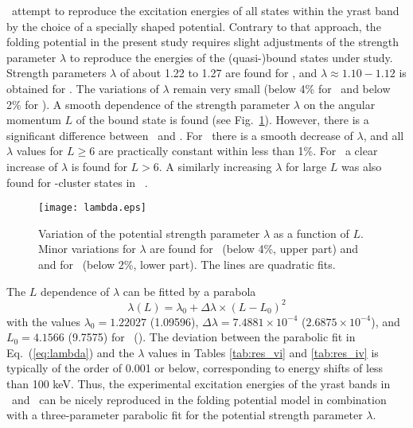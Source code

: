 \SM\ attempt to reproduce the excitation energies of all states within the
yrast band by the choice of a specially shaped potential. Contrary to that
approach, the folding potential in the present study requires slight
adjustments of the strength parameter $\lambda$ to reproduce the energies of
the (quasi-)bound states under study. Strength parameters $\lambda$ of about
1.22 to 1.27 are found for \crvi , and $\lambda \approx 1.10 - 1.12$ is
obtained for \criv . The variations of $\lambda$ remain very small (below 4\%
for \crvi\ and below 2\% for \criv ). A smooth dependence of the strength
parameter $\lambda$ on the angular momentum $L$ of the bound state is found
(see Fig.~\ref{fig:lambda}). However, there is a significant difference
between \crvi\ and \criv . For \criv\ there is a smooth decrease of $\lambda$,
and all $\lambda$ values for $L \geq 6$ are practically constant within less
than 1\%. For \crvi\ a clear increase of $\lambda$ is found for $L > 6$. A
similarly increasing $\lambda$ for large $L$ was also found for \al -cluster
states in \tiiv\ \cite{Atz96}.
%
\begin{figure}[htb]
  \texttt{[image: lambda.eps]}
\caption{
Variation of the potential strength parameter $\lambda$ as a function of
$L$. Minor variations for $\lambda$ are found for \crvi\ (below 4\%, upper
part) and and for \criv\ (below 2\%, lower part). The lines are quadratic
fits.
}
\label{fig:lambda}
\end{figure}
%

The $L$ dependence of $\lambda$ can be fitted by a parabola
%
\begin{equation}
\lambda(L) = \lambda_0 + \Delta \lambda \times (L - L_0)^2
\label{eq:lambda}
\end{equation}
%
with the values $\lambda_0 = 1.22027$ (1.09596), $\Delta \lambda = 7.4881
\times 10^{-4}$ ($2.6875 \times 10^{-4}$), and $L_0 = 4.1566$ (9.7575) for
\crvi\ (\criv ). The deviation between the parabolic fit in
Eq.~(\ref{eq:lambda}) and the $\lambda$ values in Tables \ref{tab:res_vi} and
\ref{tab:res_iv} is typically of the order of 0.001 or below, corresponding to
energy shifts of less than 100 keV. Thus, the experimental excitation energies
of the yrast bands in \crvi\ and \criv\ can be nicely reproduced in the
folding potential model in combination with a three-parameter parabolic fit
for the potential strength parameter $\lambda$.

